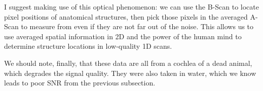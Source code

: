 \documentclass{article}
\begin{document}
\par{I suggest making use of this optical phenomenon: we can use the B-Scan to locate pixel positions of anatomical structures, then pick those pixels in the averaged A-Scan to measure from even if they are not far out of the noise. This allows us to use averaged spatial information in 2D and the power of the human mind to determine structure locations in low-quality 1D scans.}

\par{We should note, finally, that these data are all from a cochlea of a dead animal, which degrades the signal quality. They were also taken in water, which we know leads to poor SNR from the previous subsection.}
\end{document}
